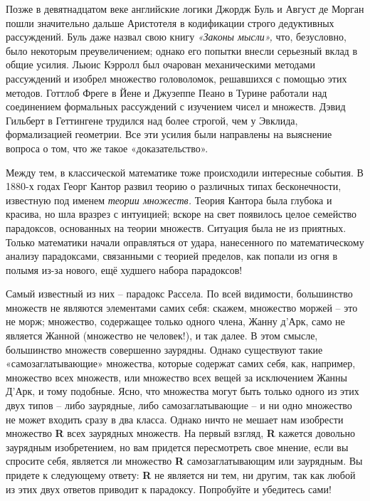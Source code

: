 \documentclass[../main.tex]{subfiles}
\begin{document}
Позже в девятнадцатом веке английские логики Джордж Буль и Август де Морган пошли значительно дальше Аристотеля в кодификации строго дедуктивных рассуждений. Буль даже назвал свою книгу \emph{«Законы мысли»,} что, безусловно, было некоторым преувеличением; однако его попытки внесли серьезный вклад в общие усилия. Льюис Кэрролл был очарован механическими методами рассуждений и изобрел множество головоломок, решавшихся с помощью этих методов. Готтлоб Фреге в Йене и Джузеппе Пеано в Турине работали над соединением формальных рассуждений с изучением чисел и множеств. Дэвид Гильберт в Геттингене трудился над более строгой, чем у Эвклида, формализацией геометрии. Все эти усилия были направлены на выяснение вопроса о том, что же такое «доказательство».

Между тем, в классической математике тоже происходили интересные события. В 1880-х годах Георг Кантор развил теорию о различных типах бесконечности, известную под именем \emph{теории множеств.} Теория Кантора была глубока и красива, но шла вразрез с интуицией; вскоре на свет появилось целое семейство парадоксов, основанных на теории множеств. Ситуация была не из приятных. Только математики начали оправляться от удара, нанесенного по математическому анализу парадоксами, связанными с теорией пределов, как попали из огня в полымя из-за нового, ещё худшего набора парадоксов!

Самый известный из них \--- парадокс Рассела. По всей видимости, большинство множеств не являются элементами самих себя: скажем, множество моржей \--- это не морж; множество, содержащее только одного члена, Жанну д'Арк, само не является Жанной (множество не человек!), и так далее. В этом смысле, большинство множеств совершенно заурядны. Однако существуют такие «самозаглатывающие» множества, которые содержат самих себя, как, например, множество всех множеств, или множество всех вещей за исключением Жанны Д'Арк, и тому подобные. Ясно, что множества могут быть только одного из этих двух типов \--- либо заурядные, либо самозаглатывающие \--- и ни одно множество не может входить сразу в два класса. Однако ничто не мешает нам изобрести множество \textbf{R} всех заурядных множеств. На первый взгляд, \textbf{R} кажется довольно заурядным изобретением, но вам придется пересмотреть свое мнение, если вы спросите себя, является ли множество \textbf{R} самозаглатывающим или заурядным. Вы придете к следующему ответу: \textbf{R} не является ни тем, ни другим, так как любой из этих двух ответов приводит к парадоксу. Попробуйте и убедитесь сами!
\end{document}
